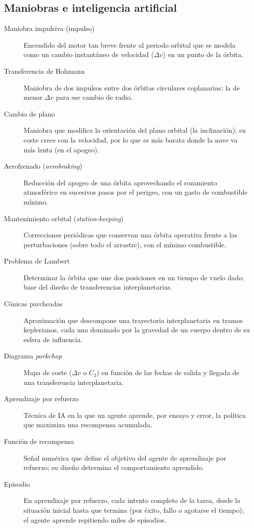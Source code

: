 \subsection*{Maniobras e inteligencia artificial}
\begin{description}
    \item[Maniobra impulsiva (impulso)] Encendido del motor tan breve frente al periodo orbital que se modela como un cambio instantáneo de velocidad ($\Delta v$) en un punto de la órbita.
  \item[Transferencia de Hohmann] Maniobra de dos impulsos entre dos órbitas circulares coplanarias; la de menor $\Delta v$ para ese cambio de radio.
  \item[Cambio de plano] Maniobra que modifica la orientación del plano orbital (la inclinación); su coste crece con la velocidad, por lo que es más barata donde la nave va más lenta (en el apogeo).
  \item[Aerofrenado (\emph{aerobraking})] Reducción del apogeo de una órbita aprovechando el rozamiento atmosférico en sucesivos pasos por el perigeo, con un gasto de combustible mínimo.
  \item[Mantenimiento orbital (\emph{station-keeping})] Correcciones periódicas que conservan una órbita operativa frente a las perturbaciones (sobre todo el arrastre), con el mínimo combustible.
  \item[Problema de Lambert] Determinar la órbita que une dos posiciones en un tiempo de vuelo dado; base del diseño de transferencias interplanetarias.
  \item[Cónicas parcheadas] Aproximación que descompone una trayectoria interplanetaria en tramos keplerianos, cada uno dominado por la gravedad de un cuerpo dentro de su esfera de influencia.
  \item[Diagrama \emph{porkchop}] Mapa de coste ($\Delta v$ o $C_3$) en función de las fechas de salida y llegada de una transferencia interplanetaria.
  \item[Aprendizaje por refuerzo] Técnica de IA en la que un agente aprende, por ensayo y error, la política que maximiza una recompensa acumulada.
  \item[Función de recompensa] Señal numérica que define el objetivo del agente de aprendizaje por refuerzo; su diseño determina el comportamiento aprendido.
    \item[Episodio] En aprendizaje por refuerzo, cada intento completo de la tarea, desde la situación inicial hasta que termina (por éxito, fallo o agotarse el tiempo); el agente aprende repitiendo miles de episodios.

\end{description}
